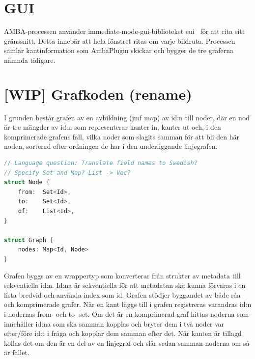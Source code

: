 
\section{GUI}
AMBA-processen använder immediate-mode-gui-biblioteket eui~\cite{egui}
för att rita sitt gränssnitt. Detta innebär att hela fönstret ritas om
varje bildruta. Processen samlar kantinformation som AmbaPlugin
skickar och bygger de tre graferna nämnda tidigare.

\section{[WIP] Grafkoden (rename)}
I grunden består grafen av en avbildning (jmf map) av id:n till noder,
där en nod är tre mängder av id:n som representerar kanter in, kanter
ut och, i den komprimerade grafens fall, vilka noder som slagits
samman för att bli den här noden, sorterad efter ordningen de har i
den underliggande linjegrafen.

\begin{lstlisting}[label={list:third}, language=Swift]
// Language question: Translate field names to Swedish?
// Specify Set and Map? List -> Vec?
struct Node {
    from:  Set<Id>,
    to:    Set<Id>,
    of:    List<Id>,
}

struct Graph {
    nodes: Map<Id, Node>
}
\end{lstlisting}

Grafen byggs av en wrappertyp som konverterar från strukter av
metadata till sekventiella id:n. Id:na är sekventiella för att
metadatan ska kunna förvaras i en lista bredvid och använda index som
id. Grafen stödjer byggandet av både råa och komprimerade grafer. När
en kant läggs till i grafen registreras varandras id:n i nodernas
from- och to- set. Om det är en komprimerad graf hittas noderna som
innehåller id:na som ska samman kopplas och bryter dem i två noder var
efter/före id:t i fråga och kopplar dem samman efter det. När kanten
är tillagd kollas det om den är en del av en linjegraf och slår sedan
samman noderna om så är fallet.

